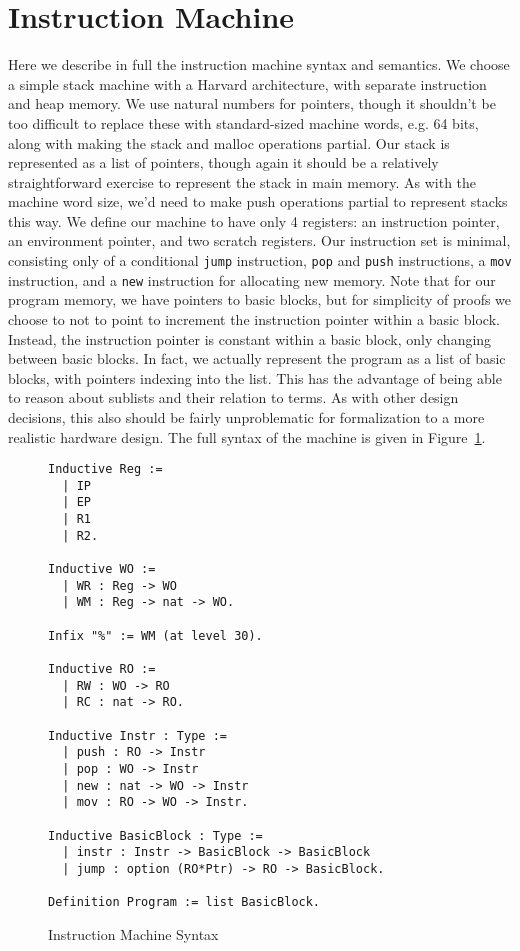 \section{Instruction Machine} \label{sec:im_semantics}

Here we describe in full the instruction machine syntax and semantics. We
choose a simple stack machine with a Harvard architecture, with separate
instruction and heap memory. We use natural numbers for pointers, though it
shouldn't be too difficult to replace these with standard-sized machine words,
e.g. 64 bits, along with making the stack and malloc operations partial. Our
stack is represented as a list of pointers, though again it should be a
relatively straightforward exercise to represent the stack in main memory. As
with the machine word size, we'd need to make push operations partial to
represent stacks this way. We define our machine to have only 4 registers: an
instruction pointer, an environment pointer, and two scratch registers. Our
instruction set is minimal, consisting only of a conditional \texttt{jump}
instruction, \texttt{pop} and \texttt{push} instructions, a \texttt{mov}
instruction, and a \texttt{new} instruction for allocating new memory. Note that
for our program memory, we have pointers to basic blocks, but for simplicity of
proofs we choose to not to point to increment the instruction pointer within a
basic block.  Instead, the instruction pointer is constant within a basic
block, only changing between basic blocks. In fact, we actually represent the
program as a list of basic blocks, with pointers indexing into the list. This
has the advantage of being able to reason about sublists and their relation to
terms. As with other design decisions, this also should be fairly
unproblematic for formalization to a more realistic hardware design. The full
syntax of the machine is given in Figure~\ref{fig:im_syntax}.  

\begin{figure}
\begin{lstlisting}
Inductive Reg := 
  | IP
  | EP
  | R1
  | R2.

Inductive WO := 
  | WR : Reg -> WO
  | WM : Reg -> nat -> WO.

Infix "%" := WM (at level 30).

Inductive RO := 
  | RW : WO -> RO
  | RC : nat -> RO.

Inductive Instr : Type :=
  | push : RO -> Instr
  | pop : WO -> Instr
  | new : nat -> WO -> Instr 
  | mov : RO -> WO -> Instr.

Inductive BasicBlock : Type :=
  | instr : Instr -> BasicBlock -> BasicBlock
  | jump : option (RO*Ptr) -> RO -> BasicBlock.

Definition Program := list BasicBlock.
\end{lstlisting}
\caption{Instruction Machine Syntax}
\label{fig:im_syntax}
\end{figure}


